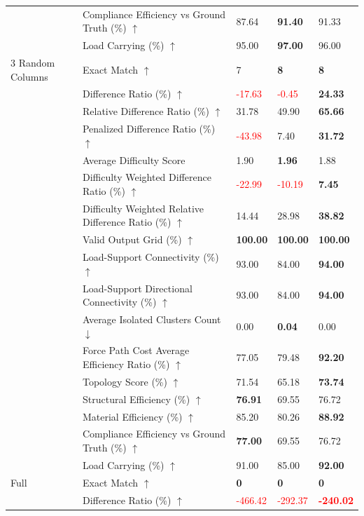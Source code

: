 \begin{table}[!h]
{\begin{tabular}{lllll}
 & Compliance Efficiency vs Ground Truth (\%) $\uparrow$ & 87.64 & \textbf{91.40} & 91.33 \\
 & Load Carrying (\%) $\uparrow$ & 95.00 & \textbf{97.00} & 96.00 \\
3 Random Columns & Exact Match $\uparrow$ & 7 & \textbf{8} & \textbf{8} \\
 & Difference Ratio (\%) $\uparrow$ & \textcolor{red}{-17.63} & \textcolor{red}{-0.45} & \textbf{24.33} \\
 & Relative Difference Ratio (\%) $\uparrow$ & 31.78 & 49.90 & \textbf{65.66} \\
 & Penalized Difference Ratio (\%) $\uparrow$ & \textcolor{red}{-43.98} & 7.40 & \textbf{31.72} \\
 & Average Difficulty Score & 1.90 & \textbf{1.96} & 1.88 \\
 & Difficulty Weighted Difference Ratio (\%) $\uparrow$ & \textcolor{red}{-22.99} & \textcolor{red}{-10.19} & \textbf{7.45} \\
 & Difficulty Weighted Relative Difference Ratio (\%) $\uparrow$ & 14.44 & 28.98 & \textbf{38.82} \\
 & Valid Output Grid (\%) $\uparrow$ & \textbf{100.00} & \textbf{100.00} & \textbf{100.00} \\
 & Load-Support Connectivity (\%) $\uparrow$ & 93.00 & 84.00 & \textbf{94.00} \\
 & Load-Support Directional Connectivity (\%) $\uparrow$ & 93.00 & 84.00 & \textbf{94.00} \\
 & Average Isolated Clusters Count $\downarrow$ & 0.00 & \textbf{0.04} & 0.00 \\
 & Force Path Cost Average Efficiency Ratio (\%) $\uparrow$ & 77.05 & 79.48 & \textbf{92.20} \\
 & Topology Score (\%) $\uparrow$ & 71.54 & 65.18 & \textbf{73.74} \\
 & Structural Efficiency (\%) $\uparrow$ & \textbf{76.91} & 69.55 & 76.72 \\
 & Material Efficiency (\%) $\uparrow$ & 85.20 & 80.26 & \textbf{88.92} \\
 & Compliance Efficiency vs Ground Truth (\%) $\uparrow$ & \textbf{77.00} & 69.55 & 76.72 \\
 & Load Carrying (\%) $\uparrow$ & 91.00 & 85.00 & \textbf{92.00} \\
Full & Exact Match $\uparrow$ & \textbf{0} & \textbf{0} & \textbf{0} \\
 & Difference Ratio (\%) $\uparrow$ & \textcolor{red}{-466.42} & \textcolor{red}{-292.37} & \textbf{\textcolor{red}{-240.02}} \\

\end{tabular}}
\end{table}
